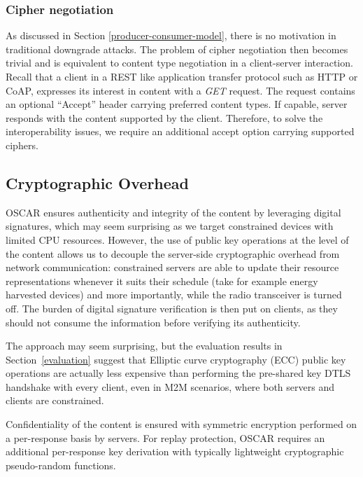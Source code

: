 \documentclass[conference]{IEEEtran}
\begin{document}
\subsubsection{Cipher negotiation}

As discussed in Section \ref{producer-consumer-model}, there is no motivation in traditional downgrade attacks.
The problem of cipher negotiation then becomes trivial and is equivalent to content type negotiation
in a client-server interaction. Recall that a client in a REST like application
transfer protocol such as HTTP or CoAP, expresses its interest in content with a
\textit{GET} request. The request contains an optional ``Accept'' header
carrying preferred content types. If capable, server responds with the content supported by the client. Therefore, to solve the interoperability issues, we require an additional accept option carrying supported ciphers. 











\subsection{Cryptographic Overhead}
\label{crypto} 

OSCAR ensures authenticity and integrity of the content by leveraging digital
signatures, which may seem surprising as we target constrained devices with
limited CPU resources. However, the use of public key operations at the level of
the content allows us to decouple the server-side cryptographic overhead from
network communication: constrained servers are able to update their
resource representations whenever it suits their schedule (take for example
energy harvested devices) and more importantly, while the radio transceiver is
turned off. The burden of digital signature verification is then put on clients,
as they should not consume the information before verifying its authenticity.

The approach may seem surprising, but the evaluation results in Section~\ref{evaluation} suggest that Elliptic curve cryptography (ECC) public key operations
are actually less expensive than performing the pre-shared key DTLS handshake with every client, even in M2M scenarios, where both servers and clients are constrained.

Confidentiality of the content is ensured with symmetric encryption performed on a per-response basis by servers. For replay protection, OSCAR requires an additional per-response key derivation with typically lightweight cryptographic pseudo-random functions.
\end{document}
